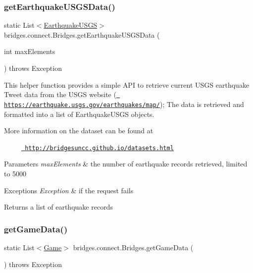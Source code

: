 \subsubsection{\texorpdfstring{getEarthquakeUSGSData()}{getEarthquakeUSGSData()}}
{\footnotesize\ttfamily static List$<$\mbox{\hyperlink{classbridges_1_1data__src__dependent_1_1_earthquake_u_s_g_s}{Earthquake\+U\+S\+GS}}$>$ bridges.\+connect.\+Bridges.\+get\+Earthquake\+U\+S\+G\+S\+Data (\begin{DoxyParamCaption}\item[{int}]{max\+Elements }\end{DoxyParamCaption}) throws Exception\hspace{0.3cm}{\ttfamily [static]}}

This helper function provides a simple A\+PI to retrieve current U\+S\+GS earthquake Tweet data from the U\+S\+GS website (\href{https://earthquake.usgs.gov/earthquakes/map/}{\texttt{ https\+://earthquake.\+usgs.\+gov/earthquakes/map/}}); The data is retrieved and formatted into a list of Earthquake\+U\+S\+GS objects.

More information on the dataset can be found at 

~~~~~\href{http://bridgesuncc.github.io/datasets.html}{\texttt{ http\+://bridgesuncc.\+github.\+io/datasets.\+html}} 


\begin{DoxyParams}{Parameters}
{\em max\+Elements} & the number of earthquake records retrieved, limited to 5000 \\
\hline
\end{DoxyParams}

\begin{DoxyExceptions}{Exceptions}
{\em Exception} & if the request fails\\
\hline
\end{DoxyExceptions}
\begin{DoxyReturn}{Returns}
a list of earthquake records 
\end{DoxyReturn}
\mbox{\label{classbridges_1_1connect_1_1_bridges_a594808b9dada5c825ac00ae0c97c9e9b}} 
\subsubsection{\texorpdfstring{getGameData()}{getGameData()}}
{\footnotesize\ttfamily static List$<$\mbox{\hyperlink{classbridges_1_1data__src__dependent_1_1_game}{Game}}$>$ bridges.\+connect.\+Bridges.\+get\+Game\+Data (\begin{DoxyParamCaption}{ }\end{DoxyParamCaption}) throws Exception\hspace{0.3cm}{\ttfamily [static]}}

